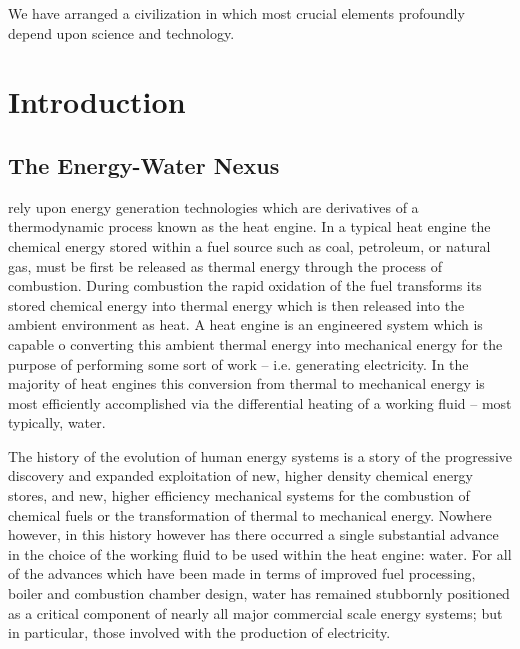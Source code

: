 \begin{savequote}[75mm]
We have arranged a civilization in which most crucial elements profoundly depend upon science and technology.
\end{savequote}

\chapter{Introduction}
\label{Introduction}

\newpage

\section{The Energy-Water Nexus}
  
 rely upon energy generation technologies which are derivatives of a thermodynamic process known as the heat engine. In a typical heat engine the chemical energy stored within a fuel source such as coal, petroleum, or natural gas, must be first be released as thermal energy through the process of combustion. During combustion the rapid oxidation of the fuel transforms its stored chemical energy into thermal energy which is then released into the ambient environment as heat. A heat engine is an engineered system which is capable o  converting this ambient thermal energy into mechanical energy for the purpose of performing some sort of work -- i.e. generating electricity. In the majority of heat engines this conversion from thermal to mechanical energy is most efficiently accomplished via the differential heating of a working fluid -- most typically, water.
    
    The history of the evolution of human energy systems is a story of the progressive discovery and expanded exploitation of new, higher density chemical energy stores, and new, higher efficiency mechanical systems for the combustion of chemical fuels or the transformation of thermal to mechanical energy. Nowhere however, in this history however has there occurred a single substantial advance in the choice of the working fluid to be used within the heat engine: water. For all of the advances which have been made in terms of improved fuel processing, boiler and combustion chamber design, water has remained stubbornly positioned as a critical component of nearly all major commercial scale energy systems; but in particular, those involved with the production of electricity. 
    
